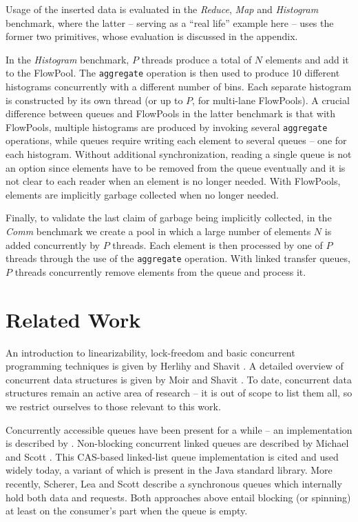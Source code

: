 \documentclass[runningheads,a4paper]{llncs}
\begin{document}
Usage of the inserted data is evaluated in the \emph{Reduce},
\emph{Map} and \emph{Histogram} benchmark, where the latter --
serving as a ``real life'' example here -- uses the former two
primitives, whose evaluation is discussed in the appendix.

In the \textit{Histogram} benchmark, $P$ threads produce a total of
$N$ elements and add it to the FlowPool.
The \verb=aggregate= operation is then used to produce 10 different
histograms concurrently with a different number of bins.
Each separate histogram is constructed by its own thread (or up to
$P$, for multi-lane FlowPools).
A crucial difference between queues and FlowPools in the latter
benchmark is that with FlowPools, multiple histograms are produced 
by invoking several \verb=aggregate= operations, while queues require
writing each element to several queues -- one for each histogram.
Without additional synchronization, reading a single queue is not an
option since elements have to be removed from the queue eventually and
it is not clear to each reader when an element is no longer needed.
With FlowPools, elements are implicitly garbage collected when no
longer needed.

Finally, to validate the last claim of garbage being implicitly
collected, in the \textit{Comm} benchmark we create a pool in which a
large number of elements $N$ is added concurrently by $P$
threads. Each element is then processed by one of $P$ threads through
the use of the \verb=aggregate= operation.
With linked transfer queues, $P$ threads concurrently remove
elements from the queue and process it.

\section{Related Work}

An introduction to linearizability, lock-freedom and basic
concurrent programming techniques is given by Herlihy and Shavit
\cite{Herlihy08}.
A detailed overview of concurrent data structures is given
by Moir and Shavit \cite{Moir05}.
To date, concurrent data structures remain an active area of
research -- it is out of scope to list them all, so we restrict
ourselves to those relevant to this work.

Concurrently accessible queues have been present for a while --
an implementation is described by \cite{Mellor87}.
Non-blocking concurrent linked queues are described by Michael and
Scott \cite{Michael96}. This CAS-based linked-list
queue implementation is cited and used widely today, a variant of
which is present in the Java standard library.
More recently, Scherer, Lea and Scott \cite{SchererLS09} describe a
synchronous queues which internally hold both data and requests.
Both approaches above entail blocking (or spinning) at least on the
consumer's part when the queue is empty.
\end{document}
